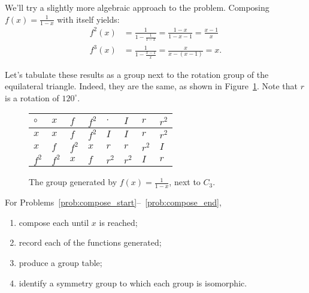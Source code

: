 \documentclass[../gatm.tex]{subfiles}
\begin{document}
\noindent We'll try a slightly more algebraic approach to the problem. Composing $f(x)=\frac{1}{1-x}$ with itself yields:
\begin{align*}
f^2(x)&=\frac{1}{1-\frac{1}{1-x}}=\frac{1-x}{1-x-1}=\frac{x-1}{x} \\
f^3(x)&=\frac{1}{1-\frac{x-1}{x}}=\frac{x}{x-(x-1)}=x.
\end{align*}

\noindent Let's tabulate these results as a group next to the rotation group of the equilateral triangle. Indeed, they are the same, as shown in Figure~\ref{fig:vs_cyclic_3}. Note that $r$ is a rotation of $120^\circ$.

\begin{figure}[h]
	\begin{center}
		\begin{minipage}[b]{\textwidth}
			\centering
			\begin{tabular}{l|lll||l|lll}
				\hline 
				$\circ$  & $x$   & $f$   & $f^2$ & $\cdot$ & $I$   & $r$   & $r^2$ \\ \hline
				\rowcolor{light-gray}
				$x$   & $x$   & $f$   & $f^2$ & $I$   & $I$   & $r$   & $r^2$ \\
				$x$   & $f$   & $f^2$ & $x$   & $r$   & $r$   & $r^2$ & $I$   \\
				\rowcolor{light-gray}
				$f^2$ & $f^2$ & $x$   & $f$   & $r^2$ & $r^2$ & $I$   & $r$   \\ \hline 
			\end{tabular}
			\vspace*{0.5\baselineskip}
		\end{minipage}
	\end{center}
	\vspace*{-2\baselineskip}
	\begin{center}
		\begin{minipage}[t]{\textwidth}
			\caption{The group generated by $f(x)=\frac{1}{1-x}$, next to $C_3$.}
			\label{fig:vs_cyclic_3}
		\end{minipage}
	\end{center}
\end{figure}

For Problems~\ref{prob:compose_start}--~\ref{prob:compose_end},
\begin{enumerate}[label=\roman*.]
\item compose each until $x$ is reached;
\item record each of the functions generated;
\item produce a group table;
\item identify a symmetry group to which each group is isomorphic.
\end{enumerate}
\end{document}
